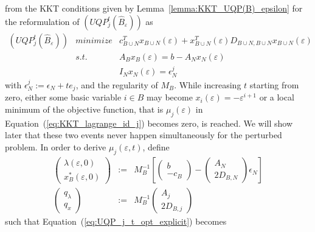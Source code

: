 \documentclass[a4paper]{article}
\newcommand{\xe}[1]{\ensuremath{x_{#1}(\varepsilon)}}
\begin{document}
from the KKT conditions given by Lemma~\ref{lemma:KKT_UQP(B)_epsilon} for the
reformulation of $(UQP_{j}^{t}(\hat{B}_{\varepsilon}))$ as
\begin{eqnarray*}
(UQP_{j}^{t}(\hat{B}_{\varepsilon})) 
  & minimize & c_{B \cup N}^{T} x_{B \cup N}(\varepsilon) +
  x_{B \cup N}^{T}(\varepsilon)D_{B \cup N, B \cup N}
  x_{B \cup N}(\varepsilon) \\
  & s.t. & A_{B}x_{B}(\varepsilon) = b - A_{N}x_{N}(\varepsilon)  \\
  && I_{N}x_{N}(\varepsilon) = \epsilon_{N}^{j}
\end{eqnarray*}
with $\epsilon_{N}^{j}:=\epsilon_{N} + te_{j}$, and the regularity of
$M_{B}$. 
While increasing $t$ starting from zero, either some basic variable $i \in B$
may become $\xe{i}=-\varepsilon^{i+1}$ or a local minimum of the
objective function, that is $\mu_{j}(\varepsilon)$ in
Equation~(\ref{eq:KKT_lagrange_id_j}) becomes zero, is reached.
We will show later that these two events never happen simultaneously for the
perturbed problem.
In order to derive $\mu_{j}\left(\varepsilon, t\right)$, define
\begin{eqnarray}
\label{def:sol_eps_zero_I}
\left(\begin{array}{c}
         \lambda\left(\varepsilon, 0\right) \\
	 \hline
	 x_{B}^{*}\left(\varepsilon, 0\right)
       \end{array}
\right)
&:=&M_{B}^{-1}
\left[
  \left(\begin{array}{c}
           b \\
	   \hline
	   -c_{B}
	\end{array}
   \right)
   -
   \left(\begin{array}{c}
           A_{N}  \\
	   \hline
	   2D_{B,N}
	 \end{array}
   \right)\epsilon_{N}
\right] 
\\
\left(\begin{array}{c}
         q_{\lambda} \\
	 \hline
	 q_{x}
       \end{array}
\right)
&:=&M_{B}^{-1}
\left(\begin{array}{c}
        A_{j} \\
	\hline
	2D_{B,j}
       \end{array}
\right)
\end{eqnarray}
such that Equation~(\ref{eq:UQP_j_t_opt_explicit}) becomes
\end{document}

